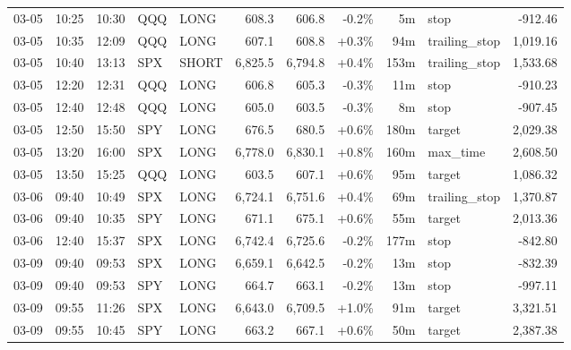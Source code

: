 \documentclass[11pt,a4paper,twoside]{article}
\begin{document}
\begin{center}
\begin{longtable}{>{\color{txtmain}}l l l l l r r r r >{\color{txtmain}}l r}
03-05 & 10:25 & 10:30 & QQQ & LONG & 608.3 & 606.8 & \textcolor{lossred}{-0.2\%} & 5m & stop & \textcolor{lossred}{-912.46} \\
03-05 & 10:35 & 12:09 & QQQ & LONG & 607.1 & 608.8 & \textcolor{wingreen}{+0.3\%} & 94m & trailing\_stop & \textcolor{wingreen}{1,019.16} \\
03-05 & 10:40 & 13:13 & SPX & SHORT & 6,825.5 & 6,794.8 & \textcolor{wingreen}{+0.4\%} & 153m & trailing\_stop & \textcolor{wingreen}{1,533.68} \\
03-05 & 12:20 & 12:31 & QQQ & LONG & 606.8 & 605.3 & \textcolor{lossred}{-0.3\%} & 11m & stop & \textcolor{lossred}{-910.23} \\
03-05 & 12:40 & 12:48 & QQQ & LONG & 605.0 & 603.5 & \textcolor{lossred}{-0.3\%} & 8m & stop & \textcolor{lossred}{-907.45} \\
03-05 & 12:50 & 15:50 & SPY & LONG & 676.5 & 680.5 & \textcolor{wingreen}{+0.6\%} & 180m & target & \textcolor{wingreen}{2,029.38} \\
03-05 & 13:20 & 16:00 & SPX & LONG & 6,778.0 & 6,830.1 & \textcolor{wingreen}{+0.8\%} & 160m & max\_time & \textcolor{wingreen}{2,608.50} \\
03-05 & 13:50 & 15:25 & QQQ & LONG & 603.5 & 607.1 & \textcolor{wingreen}{+0.6\%} & 95m & target & \textcolor{wingreen}{1,086.32} \\
03-06 & 09:40 & 10:49 & SPX & LONG & 6,724.1 & 6,751.6 & \textcolor{wingreen}{+0.4\%} & 69m & trailing\_stop & \textcolor{wingreen}{1,370.87} \\
03-06 & 09:40 & 10:35 & SPY & LONG & 671.1 & 675.1 & \textcolor{wingreen}{+0.6\%} & 55m & target & \textcolor{wingreen}{2,013.36} \\
03-06 & 12:40 & 15:37 & SPX & LONG & 6,742.4 & 6,725.6 & \textcolor{lossred}{-0.2\%} & 177m & stop & \textcolor{lossred}{-842.80} \\
03-09 & 09:40 & 09:53 & SPX & LONG & 6,659.1 & 6,642.5 & \textcolor{lossred}{-0.2\%} & 13m & stop & \textcolor{lossred}{-832.39} \\
03-09 & 09:40 & 09:53 & SPY & LONG & 664.7 & 663.1 & \textcolor{lossred}{-0.2\%} & 13m & stop & \textcolor{lossred}{-997.11} \\
03-09 & 09:55 & 11:26 & SPX & LONG & 6,643.0 & 6,709.5 & \textcolor{wingreen}{+1.0\%} & 91m & target & \textcolor{wingreen}{3,321.51} \\
03-09 & 09:55 & 10:45 & SPY & LONG & 663.2 & 667.1 & \textcolor{wingreen}{+0.6\%} & 50m & target & \textcolor{wingreen}{2,387.38} \\

\end{longtable}
\end{center}
\end{document}
